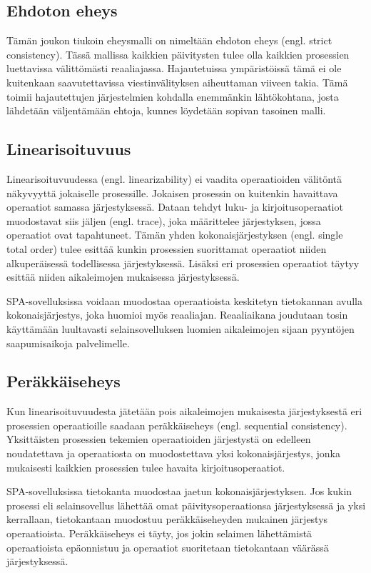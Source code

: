 \documentclass[finnish,twoside,censored,csm,sw-track-2018]{HYthesisML}
\begin{document}
\subsection{Ehdoton eheys}

Tämän joukon tiukoin eheysmalli on nimeltään ehdoton eheys (engl. strict consistency). Tässä mallissa kaikkien päivitysten tulee olla kaikkien prosessien luettavissa välittömästi reaaliajassa. Hajautetuissa ympäristöissä tämä ei ole kuitenkaan saavutettavissa viestinvälityksen aiheuttaman viiveen takia. Tämä toimii hajautettujen järjestelmien kohdalla enemmänkin lähtökohtana, josta lähdetään väljentämään ehtoja, kunnes löydetään sopivan tasoinen malli.

\subsection{Linearisoituvuus}

Linearisoituvuudessa (engl. linearizability) ei vaadita operaatioiden välitöntä näkyvyyttä jokaiselle prosessille. Jokaisen prosessin on kuitenkin havaittava operaatiot samassa järjestyksessä. Dataan tehdyt luku- ja kirjoitusoperaatiot muodostavat siis jäljen (engl. trace), joka määrittelee järjestyksen, jossa operaatiot ovat tapahtuneet. Tämän yhden kokonaisjärjestyksen (engl. single total order) tulee esittää kunkin prosessien suorittamat operaatiot niiden alkuperäisessä todellisessa järjestyksessä. Lisäksi eri prosessien operaatiot täytyy esittää niiden aikaleimojen mukaisessa järjestyksessä.

SPA-sovelluksissa voidaan muodostaa operaatioista keskitetyn tietokannan avulla kokonaisjärjestys, joka huomioi myös reaaliajan. Reaaliaikana joudutaan tosin käyttämään luultavasti selainsovelluksen luomien aikaleimojen sijaan pyyntöjen saapumisaikoja palvelimelle. 

\subsection{Peräkkäiseheys}

Kun linearisoituvuudesta jätetään pois aikaleimojen mukaisesta järjestyksestä eri prosessien operaatioille saadaan peräkkäiseheys (engl. sequential consistency). Yksittäisten prosessien tekemien operaatioiden järjestystä on edelleen noudatettava ja operaatiosta on muodostettava yksi kokonaisjärjestys, jonka mukaisesti kaikkien prosessien tulee havaita kirjoitusoperaatiot.

SPA-sovelluksissa tietokanta muodostaa jaetun kokonaisjärjestyksen. Jos kukin prosessi eli selainsovellus lähettää omat päivitysoperaationsa järjestyksessä ja yksi kerrallaan, tietokantaan muodostuu peräkkäiseheyden mukainen järjestys operaatioista. Peräkkäiseheys ei täyty, jos jokin selaimen lähettämistä operaatioista epäonnistuu ja operaatiot suoritetaan tietokantaan väärässä järjestyksessä.
\end{document}
